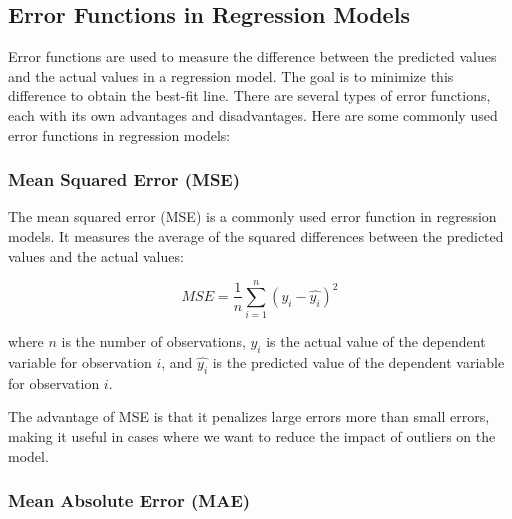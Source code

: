 \documentclass{beamer}
\begin{document}
\subsection{Error Functions in Regression Models}

Error functions are used to measure the difference between the predicted values and the actual values in a regression model. The goal is to minimize this difference to obtain the best-fit line. There are several types of error functions, each with its own advantages and disadvantages. Here are some commonly used error functions in regression models:

\subsubsection{Mean Squared Error (MSE)}
\begin{center}
    \end{center}
The mean squared error (MSE) is a commonly used error function in regression models. It measures the average of the squared differences between the predicted values and the actual values:

\begin{equation}
MSE = \frac{1}{n}\sum_{i=1}^{n}(y_i - \hat{y_i})^2
\end{equation}

where $n$ is the number of observations, $y_i$ is the actual value of the dependent variable for observation $i$, and $\hat{y_i}$ is the predicted value of the dependent variable for observation $i$.

The advantage of MSE is that it penalizes large errors more than small errors, making it useful in cases where we want to reduce the impact of outliers on the model.
\subsubsection{Mean Absolute Error (MAE)}

\begin{center}
\end{center}
\end{document}
